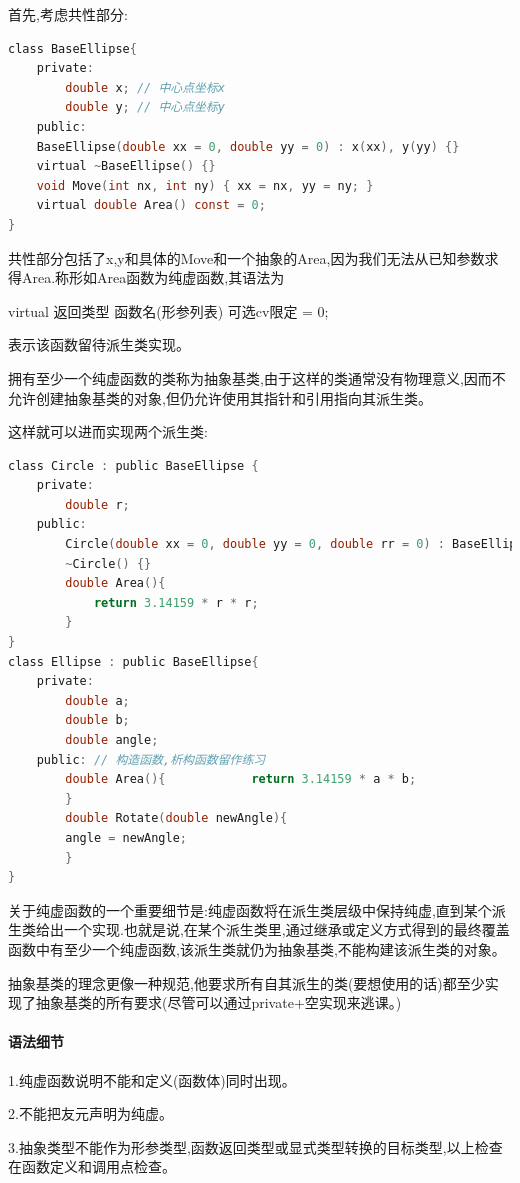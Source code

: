 \documentclass[UTF8]{ctexart}
\begin{document}
首先,考虑共性部分:
\begin{lstlisting}[language = C,basicstyle=\small\ttfamily]
class BaseEllipse{    
    private:        
        double x; // 中心点坐标x  
        double y; // 中心点坐标y
    public:     
    BaseEllipse(double xx = 0, double yy = 0) : x(xx), y(yy) {}        
    virtual ~BaseEllipse() {}   
    void Move(int nx, int ny) { xx = nx, yy = ny; }
    virtual double Area() const = 0; 
} 
\end{lstlisting}
共性部分包括了x,y和具体的Move和一个抽象的Area,因为我们无法从已知参数求得Area.称形如Area函数为纯虚函数,其语法为

virtual 返回类型 函数名(形参列表) 可选cv限定 = 0; 

表示该函数留待派生类实现。

拥有至少一个纯虚函数的类称为抽象基类,由于这样的类通常没有物理意义,因而不允许创建抽象基类的对象,但仍允许使用其指针和引用指向其派生类。

这样就可以进而实现两个派生类:
\begin{lstlisting}[language = C,basicstyle=\small\ttfamily]
class Circle : public BaseEllipse {   
    private:       
        double r;    
    public:       
        Circle(double xx = 0, double yy = 0, double rr = 0) : BaseEllipse(xx, yy), r(rr) {}
        ~Circle() {}
        double Area(){
            return 3.14159 * r * r;       
        }
} 
class Ellipse : public BaseEllipse{    
    private:        
        double a;      
        double b;     
        double angle; 
    public: // 构造函数,析构函数留作练习
        double Area(){            return 3.14159 * a * b;
        }        
        double Rotate(double newAngle){
        angle = newAngle;
        }
}
\end{lstlisting}

关于纯虚函数的一个重要细节是:纯虚函数将在派生类层级中保持纯虚,直到某个派生类给出一个实现.也就是说,在某个派生类里,通过继承或定义方式得到的最终覆盖函数中有至少一个纯虚函数,该派生类就仍为抽象基类,不能构建该派生类的对象。

抽象基类的理念更像一种规范,他要求所有自其派生的类(要想使用的话)都至少实现了抽象基类的所有要求(尽管可以通过private+空实现来逃课。)
\paragraph{语法细节}
1.纯虚函数说明不能和定义(函数体)同时出现。

2.不能把友元声明为纯虚。

3.抽象类型不能作为形参类型,函数返回类型或显式类型转换的目标类型,以上检查在函数定义和调用点检查。
\end{document}
